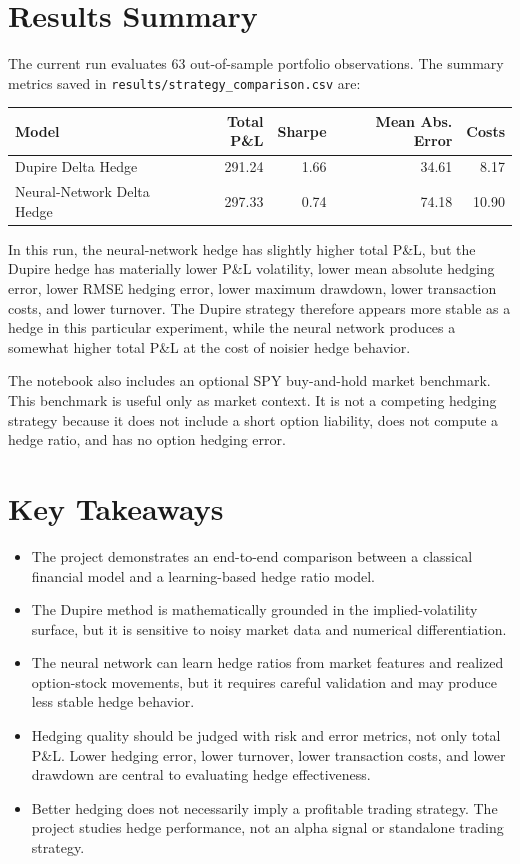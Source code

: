 \documentclass[11pt]{article}
\begin{document}
\section*{Results Summary}

The current run evaluates 63 out-of-sample portfolio observations. The summary
metrics saved in \texttt{results/strategy\_comparison.csv} are:

\begin{center}
\begin{tabular}{lrrrr}
\toprule
Model & Total P\&L & Sharpe & Mean Abs. Error & Costs \\
\midrule
Dupire Delta Hedge & 291.24 & 1.66 & 34.61 & 8.17 \\
Neural-Network Delta Hedge & 297.33 & 0.74 & 74.18 & 10.90 \\
\bottomrule
\end{tabular}
\end{center}

In this run, the neural-network hedge has slightly higher total P\&L, but the
Dupire hedge has materially lower P\&L volatility, lower mean absolute hedging
error, lower RMSE hedging error, lower maximum drawdown, lower transaction
costs, and lower turnover. The Dupire strategy therefore appears more stable as
a hedge in this particular experiment, while the neural network produces a
somewhat higher total P\&L at the cost of noisier hedge behavior.

The notebook also includes an optional SPY buy-and-hold market benchmark. This
benchmark is useful only as market context. It is not a competing hedging
strategy because it does not include a short option liability, does not compute a
hedge ratio, and has no option hedging error.

\section*{Key Takeaways}

\begin{itemize}
    \item The project demonstrates an end-to-end comparison between a classical
    financial model and a learning-based hedge ratio model.
    \item The Dupire method is mathematically grounded in the implied-volatility
    surface, but it is sensitive to noisy market data and numerical
    differentiation.
    \item The neural network can learn hedge ratios from market features and
    realized option-stock movements, but it requires careful validation and may
    produce less stable hedge behavior.
    \item Hedging quality should be judged with risk and error metrics, not only
    total P\&L. Lower hedging error, lower turnover, lower transaction costs, and
    lower drawdown are central to evaluating hedge effectiveness.
    \item Better hedging does not necessarily imply a profitable trading
    strategy. The project studies hedge performance, not an alpha signal or
    standalone trading strategy.
\end{itemize}
\end{document}
